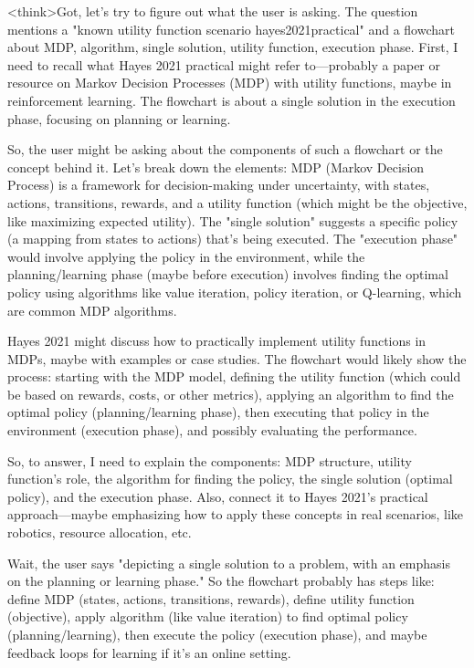 <think>Got, let's try to figure out what the user is asking. The question mentions a "known utility function scenario hayes2021practical" and a flowchart about MDP, algorithm, single solution, utility function, execution phase. First, I need to recall what Hayes 2021 practical might refer to—probably a paper or resource on Markov Decision Processes (MDP) with utility functions, maybe in reinforcement learning. The flowchart is about a single solution in the execution phase, focusing on planning or learning.

So, the user might be asking about the components of such a flowchart or the concept behind it. Let's break down the elements: MDP (Markov Decision Process) is a framework for decision-making under uncertainty, with states, actions, transitions, rewards, and a utility function (which might be the objective, like maximizing expected utility). The "single solution" suggests a specific policy (a mapping from states to actions) that's being executed. The "execution phase" would involve applying the policy in the environment, while the planning/learning phase (maybe before execution) involves finding the optimal policy using algorithms like value iteration, policy iteration, or Q-learning, which are common MDP algorithms.

Hayes 2021 might discuss how to practically implement utility functions in MDPs, maybe with examples or case studies. The flowchart would likely show the process: starting with the MDP model, defining the utility function (which could be based on rewards, costs, or other metrics), applying an algorithm to find the optimal policy (planning/learning phase), then executing that policy in the environment (execution phase), and possibly evaluating the performance.

So, to answer, I need to explain the components: MDP structure, utility function's role, the algorithm for finding the policy, the single solution (optimal policy), and the execution phase. Also, connect it to Hayes 2021's practical approach—maybe emphasizing how to apply these concepts in real scenarios, like robotics, resource allocation, etc.

Wait, the user says "depicting a single solution to a problem, with an emphasis on the planning or learning phase." So the flowchart probably has steps like: define MDP (states, actions, transitions, rewards), define utility function (objective), apply algorithm (like value iteration) to find optimal policy (planning/learning), then execute the policy (execution phase), and maybe feedback loops for learning if it's an online setting.

